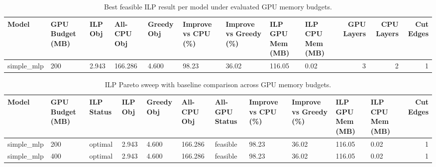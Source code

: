 \begin{table}[t]
\centering
\caption{Best feasible ILP result per model under evaluated GPU memory budgets.}
\label{tab:ilp-best-per-model}
\begin{tabular}{lllllllllrrr}
\toprule
Model & GPU Budget (MB) & ILP Obj & All-CPU Obj & Greedy Obj & Improve vs CPU (\%) & Improve vs Greedy (\%) & ILP GPU Mem (MB) & ILP CPU Mem (MB) & GPU Layers & CPU Layers & Cut Edges \\
\midrule
simple_mlp & 200 & 2.943 & 166.286 & 4.600 & 98.23 & 36.02 & 116.05 & 0.02 & 3 & 2 & 1 \\
\bottomrule
\end{tabular}

\end{table}

\begin{table}[t]
\centering
\caption{ILP Pareto sweep with baseline comparison across GPU memory budgets.}
\label{tab:ilp-budget-sweep}
\begin{tabular}{lllllllllllr}
\toprule
Model & GPU Budget (MB) & ILP Status & ILP Obj & Greedy Obj & All-CPU Obj & All-GPU Status & Improve vs CPU (\%) & Improve vs Greedy (\%) & ILP GPU Mem (MB) & ILP CPU Mem (MB) & Cut Edges \\
\midrule
simple_mlp & 200 & optimal & 2.943 & 4.600 & 166.286 & feasible & 98.23 & 36.02 & 116.05 & 0.02 & 1 \\
simple_mlp & 400 & optimal & 2.943 & 4.600 & 166.286 & feasible & 98.23 & 36.02 & 116.05 & 0.02 & 1 \\
\bottomrule
\end{tabular}

\end{table}
